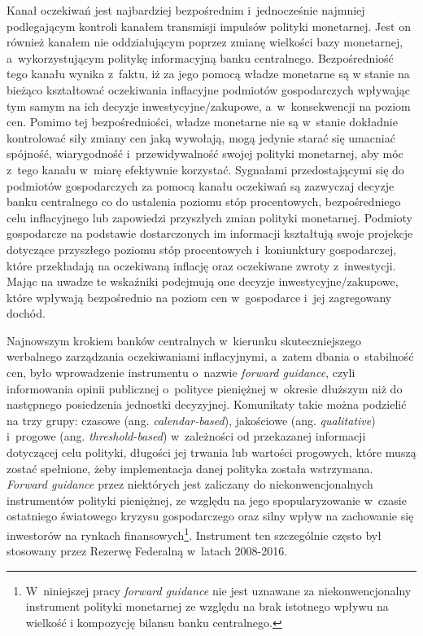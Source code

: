 Kanał oczekiwań jest najbardziej bezpośrednim i~jednocześnie najmniej podlegającym kontroli kanałem transmisji impulsów polityki monetarnej. Jest on również kanałem nie oddziałującym poprzez zmianę wielkości bazy monetarnej, a~wykorzystującym politykę informacyjną banku centralnego. Bezpośredniość tego kanału wynika z~faktu, iż za jego pomocą władze monetarne są w stanie na bieżąco kształtować oczekiwania inflacyjne podmiotów gospodarczych wpływając tym samym na ich decyzje inwestycyjne/zakupowe, a~w~konsekwencji na poziom cen. Pomimo tej bezpośredniości, władze monetarne nie są w~stanie dokładnie kontrolować siły zmiany cen jaką wywołają, mogą jedynie starać się umacniać spójność, wiarygodność i~przewidywalność swojej polityki monetarnej, aby móc z~tego kanału w~miarę efektywnie korzystać. Sygnałami przedostającymi się do podmiotów gospodarczych za pomocą kanału oczekiwań są zazwyczaj decyzje banku centralnego co do ustalenia poziomu stóp procentowych, bezpośredniego celu inflacyjnego lub zapowiedzi przyszłych zmian polityki monetarnej. Podmioty gospodarcze na podstawie dostarczonych im informacji kształtują swoje projekcje dotyczące przyszłego poziomu stóp procentowych i~koniunktury gospodarczej, które przekładają na oczekiwaną inflację oraz oczekiwane zwroty z~inwestycji. Mając na uwadze te wskaźniki podejmują one decyzje inwestycyjne/zakupowe, które wpływają bezpośrednio na poziom cen w~gospodarce i~jej zagregowany dochód. 

Najnowszym krokiem banków centralnych w~kierunku skuteczniejszego werbalnego zarządzania oczekiwaniami inflacyjnymi, a~zatem dbania o~stabilność cen, było wprowadzenie instrumentu o~nazwie \textit{forward guidance}, czyli informowania opinii publicznej o~polityce pieniężnej w~okresie dłuższym niż do następnego posiedzenia jednostki decyzyjnej. Komunikaty takie można podzielić na trzy grupy: czasowe (ang. \textit{calendar-based}), jakościowe (ang. \textit{qualitative}) i~progowe (ang. \textit{threshold-based}) w~zależności od przekazanej informacji dotyczącej celu polityki, długości jej trwania lub wartości progowych, które muszą zostać spełnione, żeby implementacja danej polityka została wstrzymana. \textit{Forward guidance} przez niektórych jest zaliczany do niekonwencjonalnych instrumentów polityki pieniężnej, ze względu na jego spopularyzowanie w~czasie ostatniego światowego kryzysu gospodarczego oraz silny wpływ na zachowanie się inwestorów na rynkach finansowych\footnote{W~niniejszej pracy \textit{forward guidance} nie jest uznawane za niekonwencjonalny instrument polityki monetarnej ze względu na brak istotnego wpływu na wielkość i kompozycję bilansu banku centralnego.}. Instrument ten szczególnie często był stosowany przez Rezerwę Federalną w~latach 2008-2016.

